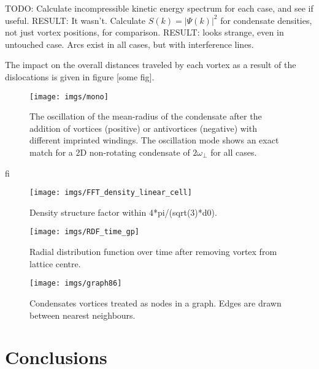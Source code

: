TODO:
Calculate incompressible kinetic energy spectrum for each case, and see if useful. RESULT: It wasn't.
Calculate $S(k) = |\Psi(k)|^2$ for condensate densities, not just vortex positions, for comparison. RESULT: looks strange, even in untouched
case. Arcs exist in all cases, but with interference lines.

The impact on the overall distances traveled by each vortex as a result of the dislocations is given in figure [some fig].

\iffalse
\begin{figure}[tb]
	\texttt{[image: imgs/mono]}
	\caption{The oscillation of the mean-radius of the condensate after the addition of vortices (positive) or antivortices (negative) with
	different imprinted windings. The oscillation mode shows an exact match for a 2D non-rotating condensate of $2\omega_{\perp}$ for all cases.}
\end{figure}
fi

\begin{figure}[tb]
	\texttt{[image: imgs/FFT\_density\_linear\_cell]}
	\caption{Density structure factor within 4*pi/(sqrt(3)*d0).}
\end{figure}


\begin{figure}[tb]
	\texttt{[image: imgs/RDF\_time\_gp]}
	\caption{Radial distribution function over time after removing vortex from lattice centre. }
\end{figure}


\begin{figure}[tb]
	\texttt{[image: imgs/graph86]}
	\caption{Condensates vortices treated as nodes in a graph. Edges are drawn between nearest neighbours.}
\end{figure}
\section{Conclusions}\label{sec:conc}

